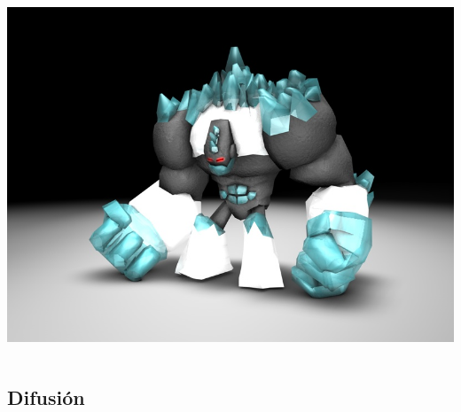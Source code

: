 \documentclass[green]{beamer}
\begin{document}
\begin{frame}
\begin{columns}[t]
    \column{150pt}
	
	\begin{center}
	    \includegraphics[scale=0.15]{img/golem.jpg}
	\end{center}
	
    \end{columns} 
\end{frame}

\subsection{Difusión}
\end{document}
